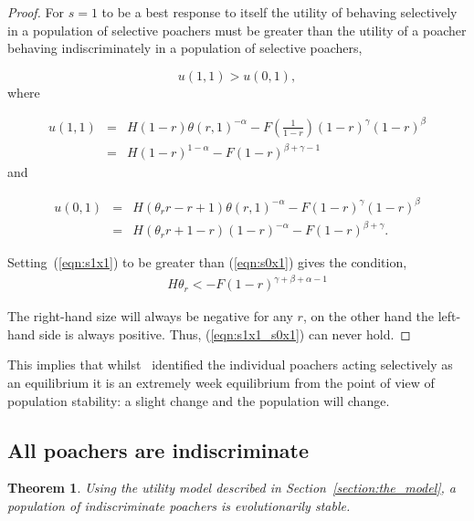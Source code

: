 \documentclass[10pt]{article}
\newtheorem{theorem}{Theorem}
\begin{document}
\begin{proof}
    For \(s=1\) to be a best response to itself the utility of behaving
    selectively in a population of selective poachers must be greater than the utility
    of a poacher behaving indiscriminately in a population of selective poachers,

    \begin{equation}
    u(1,1) > u(0,1),
    \end{equation}
    where
    
    \begin{eqnarray}
    \label{eqn:s1x1}
    u(1, 1) & = & H(1 -r)\theta(r, 1) ^ {- \alpha} - F (\frac{1}{1 - r})(1 - r)^{\gamma}(1 - r)^{\beta} \\
           & = & H(1 - r)^{1 - \alpha} - F(1 - r)^{\beta + \gamma - 1}
    \end{eqnarray}
    and 
    
    \begin{eqnarray}
    \label{eqn:s0x1}
    u(0,1) & = & H(\theta_r r - r + 1)\theta(r, 1) ^ {- \alpha} - F (1 - r)^{\gamma}(1 - r)^{\beta} \\
           & = & H(\theta_r r +1 - r)(1 - r)^{-\alpha} - F(1 - r)^{\beta + \gamma}.
    \end{eqnarray}

    Setting~(\ref{eqn:s1x1}) to be greater than (\ref{eqn:s0x1}) gives the
    condition,
    \begin{eqnarray}
    \label{eqn:s1x1_s0x1}
    &&H \theta_r< -F(1 - r)^{\gamma + \beta + \alpha - 1}
    \end{eqnarray}

    The right-hand size  will always be negative
    for any \(r\), on the other hand the left-hand side is always positive.
    Thus, (\ref{eqn:s1x1_s0x1}) can never hold. 
\end{proof}

This implies that whilst~\cite{Lee} identified the individual poachers
acting selectively as an equilibrium it is an extremely week equilibrium from
the point of view of population stability: a slight change and the population
will change.

\subsection{All poachers are indiscriminate}

\begin{theorem}\label{theorem:indiscriminate}
Using the utility model described in Section~\ref{section:the_model}, a population
of indiscriminate poachers is evolutionarily stable.
\end{theorem}
\end{document}

